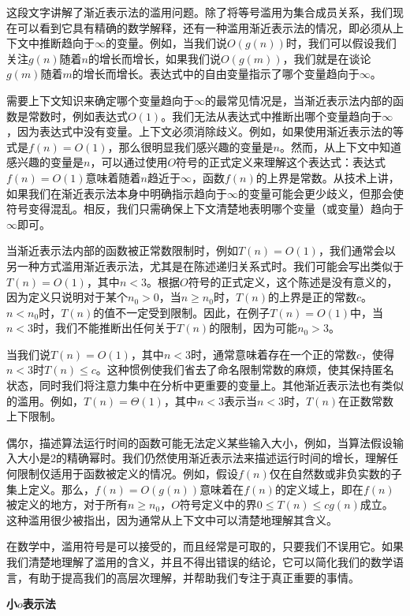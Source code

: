 \documentclass[lang=cn,newtx,10pt,scheme=chinese]{elegantbook}
\begin{document}
这段文字讲解了渐近表示法的滥用问题。除了将等号滥用为集合成员关系，我们现在可以看到它具有精确的数学解释，还有一种滥用渐近表示法的情况，即必须从上下文中推断趋向于$\infty$的变量。例如，当我们说$O(g(n))$时，我们可以假设我们关注$g(n)$随着$n$的增长而增长，如果我们说$O(g(m))$，我们就是在谈论$g(m)$随着$m$的增长而增长。表达式中的自由变量指示了哪个变量趋向于$\infty$。

需要上下文知识来确定哪个变量趋向于$\infty$的最常见情况是，当渐近表示法内部的函数是常数时，例如表达式$O(1)$。我们无法从表达式中推断出哪个变量趋向于$\infty$，因为表达式中没有变量。上下文必须消除歧义。例如，如果使用渐近表示法的等式是$f(n)=O(1)$，那么很明显我们感兴趣的变量是$n$。然而，从上下文中知道感兴趣的变量是$n$，可以通过使用$O$符号的正式定义来理解这个表达式：表达式$f(n)=O(1)$意味着随着$n$趋近于$\infty$，函数$f(n)$的上界是常数。从技术上讲，如果我们在渐近表示法本身中明确指示趋向于$\infty$的变量可能会更少歧义，但那会使符号变得混乱。相反，我们只需确保上下文清楚地表明哪个变量（或变量）趋向于$\infty$即可。

当渐近表示法内部的函数被正常数限制时，例如$T(n)=O(1)$，我们通常会以另一种方式滥用渐近表示法，尤其是在陈述递归关系式时。我们可能会写出类似于$T(n)=O(1)$，其中$n<3$。根据$O$符号的正式定义，这个陈述是没有意义的，因为定义只说明对于某个$n_0>0$，当$n \geq n_0$时，$T(n)$的上界是正的常数$c$。$n<n_0$时，$T(n)$的值不一定受到限制。因此，在例子$T(n)=O(1)$中，当$n<3$时，我们不能推断出任何关于$T(n)$的限制，因为可能$n_0>3$。

当我们说$T(n)=O(1)$，其中$n<3$时，通常意味着存在一个正的常数$c$，使得$n<3$时$T(n) \leq c$。这种惯例使我们省去了命名限制常数的麻烦，使其保持匿名状态，同时我们将注意力集中在分析中更重要的变量上。其他渐近表示法也有类似的滥用。例如，$T(n)=\Theta(1)$，其中$n<3$表示当$n<3$时，$T(n)$在正数常数上下限制。

偶尔，描述算法运行时间的函数可能无法定义某些输入大小，例如，当算法假设输入大小是2的精确幂时。我们仍然使用渐近表示法来描述运行时间的增长，理解任何限制仅适用于函数被定义的情况。例如，假设$f(n)$仅在自然数或非负实数的子集上定义。那么，$f(n)=O(g(n))$意味着在$f(n)$的定义域上，即在$f(n)$被定义的地方，对于所有$n \geq n_0$，$O$符号定义中的界$0 \leq T(n) \leq c g(n)$成立。这种滥用很少被指出，因为通常从上下文中可以清楚地理解其含义。

在数学中，滥用符号是可以接受的，而且经常是可取的，只要我们不误用它。如果我们清楚地理解了滥用的含义，并且不得出错误的结论，它可以简化我们的数学语言，有助于提高我们的高层次理解，并帮助我们专注于真正重要的事情。

\textbf{小$o$表示法}
\end{document}

